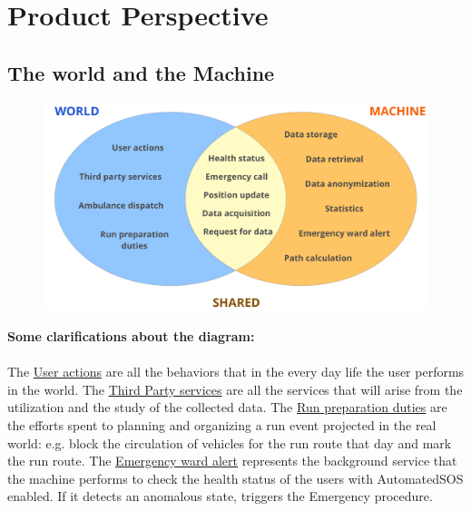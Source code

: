 \section{Product Perspective}
\subsection{The world and the Machine}
\begin{figure}[H]
    \centering
    \includegraphics[scale=0.3]{./Pictures/worldmachine.png}

\end{figure}

\textbf{Some clarifications about the diagram:}\\ \\
The \underline{User actions} are all the behaviors that in the every day life the user performs in the world. The \underline{Third Party services} are all the services that will arise from the utilization and the study of the collected data. The \underline{Run preparation duties} are the efforts spent to planning and organizing a run event projected in the real world: e.g. block the circulation of vehicles for the run route that day and mark the run route. The \underline{Emergency ward alert} represents the background service that the machine performs to check the health status
of the users with AutomatedSOS enabled. If it detects an anomalous state, triggers the Emergency procedure.

\newpage
